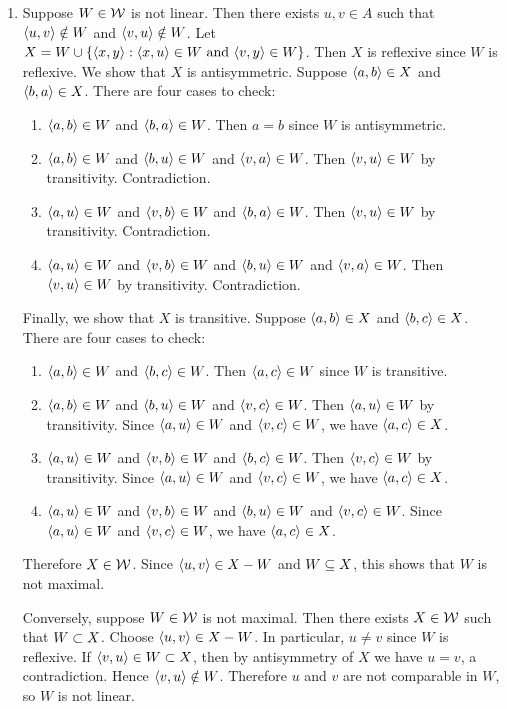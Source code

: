 \begin{solution}
\begin{enumerate}[label=(\alph*)]
    \item Suppose $W\in\mathcal{W}$ is not linear.
    Then there exists $u,v\in A$ such that $\left\langle u,v\right\rangle\notin W$ and $\left\langle v,u\right\rangle\notin W$.
    Let $X=W\cup\setb{\aprn{x,y}}{\aprn{x,u}\in W\land \aprn{v,y} \in W}$. Then $X$ is reflexive
    since $W$ is reflexive. We show that $X$ is antisymmetric.
    Suppose $\left\langle a,b\right\rangle\in X$ and $\left\langle b,a\right\rangle\in X$.
    There are four cases to check:
    \begin{enumerate}[label=(\roman*)]
        \item $\left\langle a,b\right\rangle\in W$ and $\left\langle b,a\right\rangle\in W$. Then $a=b$ since $W$ is antisymmetric.
        \item $\left\langle a,b\right\rangle\in W$ and $\left\langle b,u\right\rangle\in W$ and $\left\langle v,a\right\rangle\in W$. Then $\left\langle v,u\right\rangle\in W$ by transitivity.
        Contradiction.
        \item $\left\langle a,u\right\rangle\in W$ and $\left\langle v,b\right\rangle\in W$ and $\left\langle b,a\right\rangle\in W$. Then $\left\langle v,u\right\rangle\in W$ by transitivity.
        Contradiction.
        \item $\left\langle a,u\right\rangle\in W$ and $\left\langle v,b\right\rangle\in W$ and $\left\langle b,u\right\rangle\in W$ and $\left\langle v,a\right\rangle\in W$.
        Then $\left\langle v,u\right\rangle\in W$ by transitivity. Contradiction.
    \end{enumerate}
    Finally, we show that $X$ is transitive.
    Suppose $\left\langle a,b\right\rangle\in X$ and $\left\langle b,c\right\rangle\in X$.
    There are four cases to check:
    \begin{enumerate}[label=(\roman*)]
        \item $\left\langle a,b\right\rangle\in W$ and $\left\langle b,c\right\rangle\in W$. Then $\left\langle a,c\right\rangle\in W$ since $W$ is transitive.
        \item $\left\langle a,b\right\rangle\in W$ and $\left\langle b,u\right\rangle\in W$ and $\left\langle v,c\right\rangle\in W$. Then $\left\langle a,u\right\rangle\in W$ by transitivity.
        Since $\left\langle a,u\right\rangle\in W$ and $\left\langle v,c\right\rangle\in W$, we have $\left\langle a,c\right\rangle\in X$.
        \item $\left\langle a,u\right\rangle\in W$ and $\left\langle v,b\right\rangle\in W$ and $\left\langle b,c\right\rangle\in W$. Then $\left\langle v,c\right\rangle\in W$ by transitivity.
        Since $\left\langle a,u\right\rangle\in W$ and $\left\langle v,c\right\rangle\in W$, we have $\left\langle a,c\right\rangle\in X$.
        \item $\left\langle a,u\right\rangle\in W$ and $\left\langle v,b\right\rangle\in W$ and $\left\langle b,u\right\rangle\in W$ and $\left\langle v,c\right\rangle\in W$.
        Since $\left\langle a,u\right\rangle\in W$ and $\left\langle v,c\right\rangle\in W$, we have $\left\langle a,c\right\rangle\in X$.
    \end{enumerate}
    Therefore $X\in\mathcal{W}$. Since $\left\langle u,v\right\rangle\in X-W$ and $W\subseteq X$, this shows that $W$ is not maximal.

    Conversely, suppose $W\in \mathcal{W}$ is not maximal. Then there exists $X\in\mathcal{W}$ such that $W\subset X$.
    Choose $\left\langle u,v\right\rangle\in X-W$. In particular, $u\neq v$ since $W$ is reflexive.
    If $\left\langle v,u\right\rangle\in W\subset X$, then by antisymmetry of $X$ we have $u=v$, a contradiction.
    Hence $\left\langle v,u\right\rangle\notin W$. Therefore $u$ and $v$ are not comparable in $W$, so $W$ is not linear.


\end{enumerate}
\end{solution}
